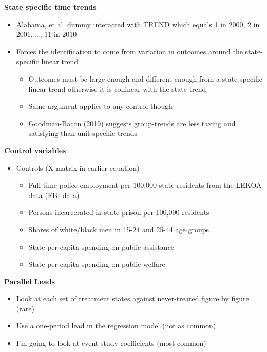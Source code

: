 \documentclass[notes=show]{beamer}
\begin{document}
\begin{frame}[plain]
\begin{center}
\textbf{State specific time trends}
\end{center}

		\begin{itemize}
		\item Alabama, et al. dummy interacted with TREND which equals 1 in 2000, 2 in 2001, \dots , 11 in 2010
		\item Forces the identification to come from variation in outcomes around the state-specific linear trend 
			\begin{itemize}
			\item Outcomes must be large enough and different enough from a state-specific linear trend otherwise it is collinear with the state-trend
			\item Same argument applies to any control though
			\item Goodman-Bacon (2019) suggests group-trends are less taxing and satisfying than unit-specific trends
			\end{itemize}
		\end{itemize}

\end{frame}

\begin{frame}[plain]
	\begin{center}
	\textbf{Control variables}
	\end{center}
	
	\begin{itemize}
	\item Controls (X matrix in earlier equation)
		\begin{itemize}
		\item Full-time police employment per 100,000 state residents from the LEKOA data (FBI data)
		\item Persons incarcerated in state prison per 100,000 residents
		\item Shares of white/black men in 15-24 and 25-44 age groups
		\item State per capita spending on public assistance
		\item State per capita spending on public welfare
		\end{itemize}
	\end{itemize}
\end{frame}

\begin{frame}[plain]
	\begin{center}
	\textbf{Parallel Leads}
	\end{center}
	
	\begin{itemize}
	\item Look at each set of treatment states against never-treated figure by figure (rare)
	\item Use a one-period lead in the regression model (not as common)
	\item I'm going to look at event study coefficients (most common)
	\end{itemize}
\end{frame}
\end{document}

